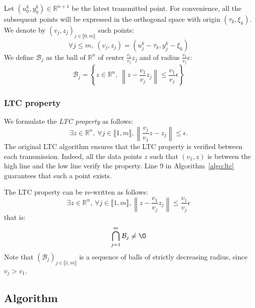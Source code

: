 \documentclass[10pt, conference, compsocconf]{IEEEtran}
\newcommand{\norm}[1]{\left\lVert#1\right\rVert}
\begin{document}
Let $(u_0^k, y_0^k) \in \mathbb{R}^{n+1}$ be the latest transmitted point. For convenience, all the subsequent points will be
expressed in the orthogonal space with origin $(\tau_k, \xi_k)$. We denote by $(v_j, z_j)_{j \in \llbracket 0, m \rrbracket}$ such points:
\begin{equation*}
\forall j \leq m,\  (v_j, z_j) = (u_j^k - \tau_k, y_j^k - \xi_k)
\end{equation*}
We define $\mathcal{B}_j$ as the ball of $\mathbb{R}^n$ of center $\frac{v_1}{v_j}z_j$ and of radius
$\frac{v_1}{v_j}\epsilon$:
\begin{equation*}
\mathcal{B}_j = \left\{ z \in \mathbb{R}^n,\  \norm{z-\frac{v_1}{v_j}z_j} \leq \frac{v_1}{v_j}\epsilon \right\}
\end{equation*}

\subsubsection{LTC property}

We formulate the \emph{LTC property} as follows:
\begin{equation*}
\exists z \in \mathbb{R}^n, \ \forall j \in \llbracket 1, m \rrbracket, \norm{\frac{v_j}{v_1}z-z_j} \leq \epsilon.
\end{equation*}
The original LTC algorithm ensures that the LTC property is
verified between each transmission. Indeed, all the data points
$z$ such that $(v_1, z)$ is between the high line and the low line
verify the property. Line 9 in Algorithm~\ref{algo:ltc} guarantees that
such a point exists.

The LTC property can be re-written as follows:
\begin{equation*}
\exists z \in \mathbb{R}^n, \ \forall j \in \llbracket 1, m \rrbracket, \norm{z-\frac{v_1}{v_j}z_j} \leq \frac{v_1}{v_j}\epsilon
\end{equation*}
that is:
\begin{equation}
\bigcap_{j=1}^m \mathcal{B}_j \neq \O
\label{eq:ltc-property}
\end{equation}
Note that $(\mathcal{B}_j)_{j \in \llbracket 1, m \rrbracket}$ is a sequence
of balls of strictly decreasing radius, since $v_j > v_1$.

\subsection{Algorithm}
\end{document}
